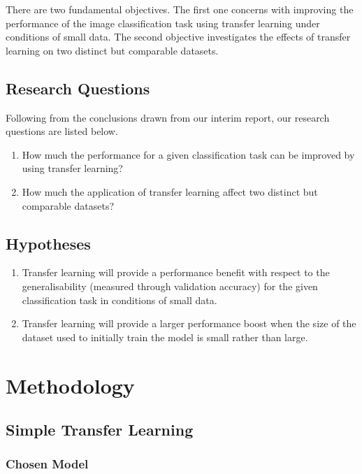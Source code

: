 \documentclass{article}
\begin{document}
There are two fundamental objectives. The first one concerns with improving the performance of the image classification task using transfer learning under conditions of small data. The second objective investigates the effects of transfer learning on two distinct but comparable datasets.

\subsection{Research Questions}
\label{sec:questions}

Following from the conclusions drawn from our interim report, our research questions are listed below.

\begin{enumerate}
  \item How much the performance for a given classification task can be improved by using transfer learning?  
  \item How much the application of transfer learning affect two distinct but comparable datasets?
\end{enumerate}

\subsection{Hypotheses}
\label{sec:hypotheses}
\begin{enumerate}[label=\textbf{H.\arabic*}]
  \item \label{h:1} Transfer learning will provide a performance benefit with respect to the generalisability (measured through validation accuracy) for the given classification task in conditions of small data.
  \item \label{h:2} Transfer learning will provide a larger performance boost when the size of the dataset used to initially train the model is small rather than large.
\end{enumerate}

\section{Methodology}
\label{sec:methodology}

\subsection{Simple Transfer Learning}
\label{sec:transferlearninng}

\subsubsection{\textbf{Chosen Model}}
\end{document}
